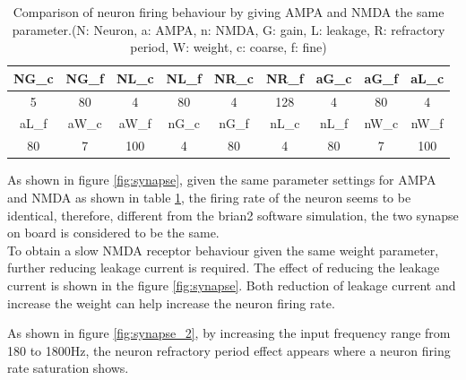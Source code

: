 \begin{table}
	\centering
	\begin{tabular}{ccccccccc}
		\toprule
		NG\_c & NG\_f & NL\_c & NL\_f & NR\_c & NR\_f & aG\_c & aG\_f & aL\_c \\
		\midrule
		5     & 80    & 4     & 80    & 4     & 128   & 4     & 80    & 4 \\
		\midrule
		aL\_f & aW\_c & aW\_f & nG\_c & nG\_f & nL\_c & nL\_f & nW\_c & nW\_f \\
		\midrule
		80    & 7     & 100   & 4     & 80    & 4     & 80    & 7     & 100 \\
		\bottomrule
	\end{tabular}%
	\label{tab:synapse}%
	\caption{Comparison of neuron firing behaviour by giving AMPA and NMDA the same parameter.(N: Neuron, a: AMPA, n: NMDA, G:  gain, L: leakage, R: refractory period, W: weight, c: coarse, f: fine)}
\end{table}%
As shown in figure \ref{fig:synapse}, given the same parameter settings for AMPA and NMDA as shown in table  \ref{tab:synapse}, the firing rate of the neuron seems to be identical, therefore, different from the brian2 software simulation, the two synapse on board is considered to be the same. \\

To obtain a slow NMDA receptor behaviour given the same weight parameter, further reducing leakage current is required. The effect of reducing the leakage current is shown in the figure \ref{fig:synapse}. Both reduction of leakage current and increase the weight can help increase the neuron firing rate.

As shown in figure \ref{fig:synapse_2}, by increasing the input frequency range from 180 to 1800Hz, the neuron refractory period effect appears where a neuron firing rate saturation shows. 


